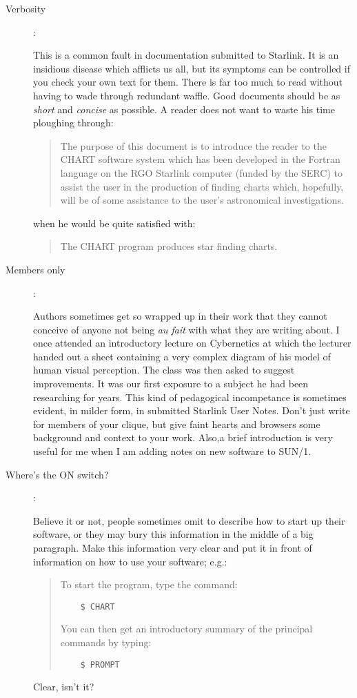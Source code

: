 \begin{description}

\item [Verbosity] :

This is a common fault in documentation submitted to Starlink.
It is an insidious disease which afflicts us all, but its symptoms can be
controlled if you check your own text for them.
There is far too much to read without having to wade through redundant waffle.
Good documents should be as {\em short}\/ and {\em concise}\/ as possible.
A reader does not want to waste his time ploughing through:
\begin{quote}
The purpose of this document is to introduce the reader to the CHART software
system which has been developed in the Fortran language on the RGO Starlink
computer (funded by the SERC) to assist the user in the production of finding
charts which, hopefully, will be of some assistance to the user's astronomical
investigations.
\end{quote}
when he would be quite satisfied with:
\begin{quote}
The CHART program produces star finding charts.
\end{quote}

\item [Members only] :

Authors sometimes get so wrapped up in their work that they cannot conceive
of anyone not being {\em au fait}\/ with what they are writing about.
I once attended an introductory lecture on Cybernetics at which the lecturer
handed out a sheet containing a very complex diagram of his model of human
visual perception.
The class was then asked to suggest improvements.
It was our first exposure to a subject he had been researching for years.
This kind of pedagogical incompetance is sometimes evident, in milder form, in
submitted Starlink User Notes.
Don't just write for members of your clique, but give faint hearts and
browsers some background and context to your work.
Also,a brief introduction is very useful for me when I am adding notes on new
software to SUN/1.

\item [Where's the ON switch?] :

Believe it or not, people sometimes omit to describe how to start up their
software, or they may bury this information in the middle of a big paragraph.
Make this information very clear and put it in front of information on how
to use your software; e.g.:
\begin{quote}
To start the program, type the command:
\begin{verbatim}
    $ CHART
\end{verbatim}
You can then get an introductory summary of the principal commands by typing:
\begin{verbatim}
    $ PROMPT
\end{verbatim}
\end{quote}
Clear, isn't it?

\end{description}

